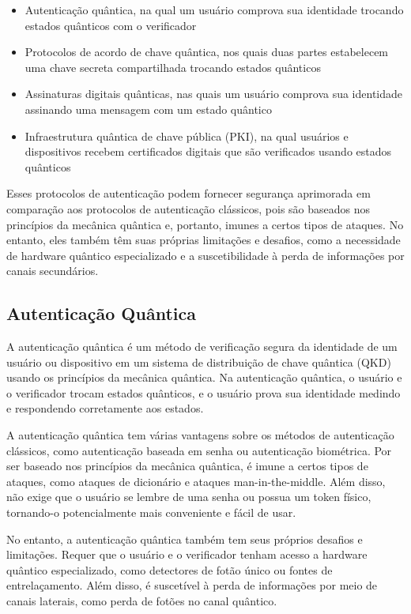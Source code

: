 \begin{itemize}
  \item Autenticação quântica, na qual um usuário comprova sua identidade trocando estados quânticos com o verificador
  \item Protocolos de acordo de chave quântica, nos quais duas partes estabelecem uma chave secreta compartilhada trocando estados quânticos
  \item Assinaturas digitais quânticas, nas quais um usuário comprova sua identidade assinando uma mensagem com um estado quântico
  \item Infraestrutura quântica de chave pública (PKI), na qual usuários e dispositivos recebem certificados digitais que são verificados usando estados quânticos
\end{itemize}

Esses protocolos de autenticação podem fornecer segurança aprimorada em comparação aos protocolos de autenticação clássicos, pois são baseados nos princípios da mecânica quântica e, portanto, imunes a certos tipos de ataques. No entanto, eles também têm suas próprias limitações e desafios, como a necessidade de hardware quântico especializado e a suscetibilidade à perda de informações por canais secundários.

\subsection{Autenticação Quântica}

A autenticação quântica é um método de verificação segura da identidade de um usuário ou dispositivo em um sistema de distribuição de chave quântica (QKD) usando os princípios da mecânica quântica. Na autenticação quântica, o usuário e o verificador trocam estados quânticos, e o usuário prova sua identidade medindo e respondendo corretamente aos estados.

A autenticação quântica tem várias vantagens sobre os métodos de autenticação clássicos, como autenticação baseada em senha ou autenticação biométrica. Por ser baseado nos princípios da mecânica quântica, é imune a certos tipos de ataques, como ataques de dicionário e ataques man-in-the-middle. Além disso, não exige que o usuário se lembre de uma senha ou possua um token físico, tornando-o potencialmente mais conveniente e fácil de usar.

No entanto, a autenticação quântica também tem seus próprios desafios e limitações. Requer que o usuário e o verificador tenham acesso a hardware quântico especializado, como detectores de fotão único ou fontes de entrelaçamento. Além disso, é suscetível à perda de informações por meio de canais laterais, como perda de fotões no canal quântico.

